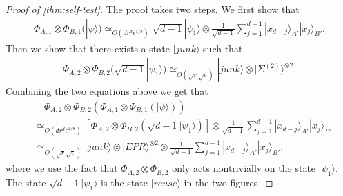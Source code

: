 \documentclass[11pt,letterpaper]{article}
\newcommand{\ket}[1]{|#1\rangle}
\newcommand{\x}{\otimes}
\newcommand{\1}{\mathbb{1}}
\newcommand{\EPR}[1]{\Sigma^{(#1)}}
\newcommand{\ep}{\epsilon}
\newcommand{\se}{\sqrt{\epsilon}}
\newcommand{\sr}{\sqrt{r}}
\newcommand{\appd}[1]{\simeq_{#1}}
\theoremstyle{definition}
\begin{document}
\begin{proof}[Proof of \cref{thm:self-test}]
The proof takes two steps. 
We first show that 
\begin{align}
	\Phi_{A,1}\x\Phi_{B,1}(\ket{\psi}) \appd{O(d r^{d} \ep^{1/8})} \sqrt{d-1}\ket{\psi_1} \x \frac{1}{\sqrt{d-1}}\sum_{j=1}^{d-1} \ket{x_{d-j}}_{A'}\ket{x_j}_{B'}.
\end{align}
Then we show that there exists a state $\ket{junk}$ such that  
\begin{align}
\label{eq:phi2_result}
\Phi_{A,2} \x \Phi_{B,2} (\sqrt{d-1}\ket{\psi_1}) \appd{O(\sr\se)} \ket{junk} \x \ket{\EPR{2}}^{\x 2}.
\end{align}
Combining the two equations above we get that 
\begin{align*}
	&\quad\Phi_{A,2} \x \Phi_{B,2}( \Phi_{A,1} \x \Phi_{B,1} (\ket{\psi})) \\
	&\appd{O(d r^d \ep^{1/8})} \left[\Phi_{A,2} \x \Phi_{B,2}
	(\sqrt{d-1} \ket{\psi_1})\right] \x \frac{1}{\sqrt{d-1}}\sum_{j=1}^{d-1} \ket{x_{d-j}}_{A'}\ket{x_j}_{B'} \\
	&\appd{O(\sr\se)} \ket{junk} \x \ket{EPR}^{\x 2} \x\frac{1}{\sqrt{d-1}}\sum_{j=1}^{d-1} \ket{x_{d-j}}_{A'}\ket{x_j}_{B'},
\end{align*}
where we use the fact that $\Phi_{A,2}\x \Phi_{B,2}$ only 
acts nontrivially on the state $\ket{\psi_1}$.
The state $\sqrt{d-1} \ket{\psi_1}$ is the state
$\ket{reuse}$ in the two figures.


\end{proof}
\end{document}
